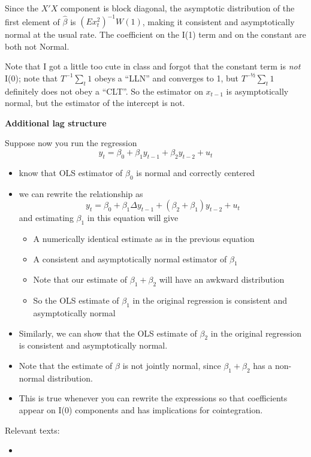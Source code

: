 Since the $X'X$ component is block diagonal, the asymptotic distribution
of the first element of $\hat \beta$ is $(E x_t^2)^{-1} W(1)$, making it
consistent and asymptotically normal at the usual rate. The coefficient
on the I(1) term and on the constant are both not Normal.

Note that I got a little too cute in class and forgot that the constant
term is \emph{not} I(0); note that $T^{-1} \sum_t 1$ obeys a ``LLN'' and
converges to 1, but $T^{-½} \sum_t 1$ definitely does not obey a ``CLT''.
So the estimator on $x_{t-1}$ is asymptotically normal, but the
estimator of the intercept is not.

\textbf{Additional lag structure}

Suppose now you run the regression
\[y_t = \beta_0 + \beta_1 y_{t-1} + \beta_2 y_{t-2} + u_t\]

\begin{itemize}
\item know that OLS estimator of $\beta_0$ is normal and correctly centered
\item we can rewrite the relationship as
  \[y_t = \beta_0 + \beta_1 \Delta y_{t-1} + (\beta_2 + \beta_1) y_{t-2} + u_t\] and
  estimating $\beta_1$ in this equation will give

  \begin{itemize}
  \item A numerically identical estimate as in the previous equation
  \item A consistent and asymptotically normal estimator of $\beta_1$
  \item Note that our estimate of $\beta_1 + \beta_2$ will have an awkward
    distribution
  \item So the OLS estimate of $\beta_1$ in the original regression is
    consistent and asymptotically normal
  \end{itemize}
\item Similarly, we can show that the OLS estimate of $\beta_2$ in the
  original regression is consistent and asymptotically normal.
\item Note that the estimate of $\beta$ is not jointly normal, since
  $\beta_1+\beta_2$ has a non-normal distribution.
\item This is true whenever you can rewrite the expressions so that
  coefficients appear on I(0) components and has implications for
  cointegration.
\end{itemize}

Relevant texts:
\begin{itemize}
\item \citet{SSW90}
\end{itemize}

